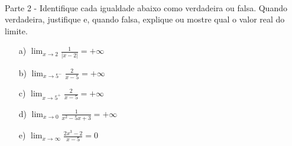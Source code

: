 \documentclass{article}
\begin{document}
\paragraph{}Parte 2 - Identifique cada igualdade abaixo como verdadeira ou falsa. Quando verdadeira, justifique e, quando falsa, explique ou mostre qual o valor real do limite.
\begin{itemize}
	\item [a)] $\lim_{x\to2}\frac{1}{|x - 2|}=+\infty$
	\item [b)] $\lim_{x\to5^-}\frac{2}{x - 5}=+\infty$
	\item [c)] $\lim_{x\to5^+}\frac{2}{x - 5}=+\infty$
	\item [d)] $\lim_{x\to0}\frac{1}{x^2 - 5x + 3}=+\infty$
	\item [e)] $\lim_{x\to\infty}\frac{2x^3 - 2}{x - 5}=0$
\end{itemize}
\end{document}
